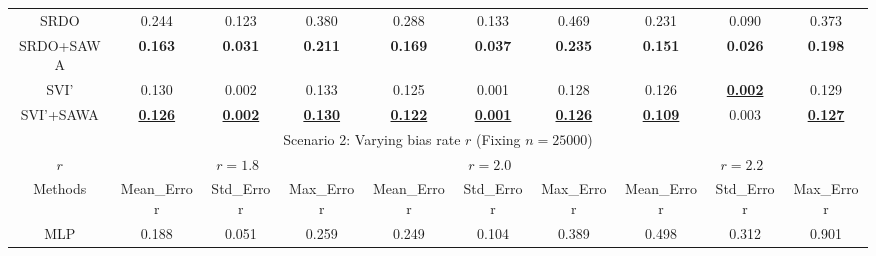 \begin{table*}[!ht]
{\begin{tabular}{@{}cccccccccc@{}}
\multicolumn{1}{c|}{SRDO}      & 0.244                & 0.123                & \multicolumn{1}{c|}{0.380}                 & 0.288                & 0.133                & \multicolumn{1}{c|}{0.469}                & 0.231                & 0.090                & 0.373                \\
\multicolumn{1}{c|}{SRDO+SAWA} & \textbf{0.163}       & \textbf{0.031}       & \multicolumn{1}{c|}{\textbf{0.211}}       & \textbf{0.169}       & \textbf{0.037}       & \multicolumn{1}{c|}{\textbf{0.235}}       & \textbf{0.151}       & \textbf{0.026}       & \textbf{0.198}       \\ \midrule
\multicolumn{1}{c|}{SVI'}      & 0.130                & 0.002                & \multicolumn{1}{c|}{0.133}                & 0.125                & 0.001                & \multicolumn{1}{c|}{0.128}                & 0.126                & {\ul \textbf{0.002}} & 0.129                \\
\multicolumn{1}{c|}{SVI'+SAWA} & {\ul \textbf{0.126}} & {\ul \textbf{0.002}} & \multicolumn{1}{c|}{{\ul \textbf{0.130}}} & {\ul \textbf{0.122}} & {\ul \textbf{0.001}} & \multicolumn{1}{c|}{{\ul \textbf{0.126}}} & {\ul \textbf{0.109}} & 0.003                & {\ul \textbf{0.127}} \\ \midrule
\multicolumn{10}{c}{Scenario 2: Varying bias rate $r$ (Fixing $n=25000$)}                                                                                                                                                                                                              \\ \midrule
\multicolumn{1}{c|}{$r$}       & \multicolumn{3}{c|}{$r=1.8$}                                                            & \multicolumn{3}{c|}{$r=2.0$}                                                            & \multicolumn{3}{c}{$r=2.2$}                                        \\ \midrule
\multicolumn{1}{c|}{Methods}   & Mean\_Error          & Std\_Error           & \multicolumn{1}{c|}{Max\_Error}           & Mean\_Error          & Std\_Error           & \multicolumn{1}{c|}{Max\_Error}           & Mean\_Error          & Std\_Error           & Max\_Error           \\ \midrule
\multicolumn{1}{c|}{MLP}       & 0.188                & 0.051                & \multicolumn{1}{c|}{0.259}                & 0.249                & 0.104                & \multicolumn{1}{c|}{0.389}                & 0.498                & 0.312                & 0.901                \\

\end{tabular}}
\end{table*}
